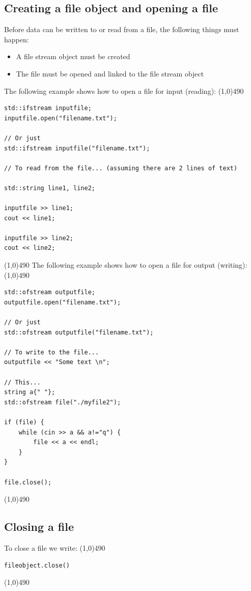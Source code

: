 \documentclass{report}
\begin{document}
    \subsection{Creating a file object and opening a file}
    \bigbreak \noindent 
    Before data can be written to or read from a file, the following things must happen:
    \begin{itemize}
        \item A file stream object must be created
        \item The file must be opened and linked to the file stream object
    \end{itemize}
    \bigbreak \noindent 
    The following example shows how to open a file for input (reading):
    \bigbreak \noindent 
    \line(1,0){490}
    \begin{verbatim}
std::ifstream inputfile;
inputfile.open("filename.txt");

// Or just
std::ifstream inputfile("filename.txt");

// To read from the file... (assuming there are 2 lines of text)

std::string line1, line2;

inputfile >> line1;
cout << line1;

inputfile >> line2;
cout << line2;
    \end{verbatim}
    \line(1,0){490}
    \bigbreak \noindent 
    The following example shows how to open a file for output (writing):
    \bigbreak \noindent 
    \line(1,0){490}
    \begin{verbatim}
std::ofstream outputfile;
outputfile.open("filename.txt");

// Or just
std::ofstream outputfile("filename.txt");

// To write to the file...
outputfile << "Some text \n";

// This...
string a{" "};
std::ofstream file("./myfile2");

if (file) {
    while (cin >> a && a!="q") {
        file << a << endl;
    }
}

file.close();
    \end{verbatim}
    \line(1,0){490}

    \bigbreak \noindent 
    \subsection{Closing a file}
    \bigbreak \noindent 
    To close a file we write:
    \bigbreak \noindent 
    \line(1,0){490}
    \begin{verbatim}
fileobject.close()
    \end{verbatim}
    \line(1,0){490}
\end{document}
